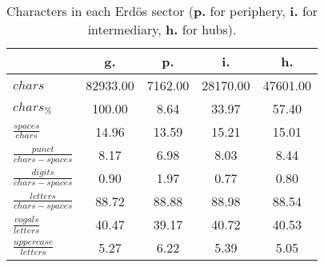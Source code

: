 \begin{table}[h!]
\begin{center}
\begin{tabular}{| l || c | c | c | c |}\hline
 & {\bf g.} & {\bf p.} & {\bf i.} & {\bf h.} \\\hline\hline
$chars$ & 82933.00  & 7162.00  & 28170.00  & 47601.00 \\
$chars_{\%}$ & 100.00  & 8.64  & 33.97  & 57.40 \\\hline
$\frac{spaces}{chars}$ & 14.96  & 13.59  & 15.21  & 15.01 \\
$\frac{punct}{chars-spaces}$ & 8.17  & 6.98  & 8.03  & 8.44 \\
$\frac{digits}{chars-spaces}$ & 0.90  & 1.97  & 0.77  & 0.80 \\\hline
$\frac{letters}{chars-spaces}$ & 88.72  & 88.88  & 88.98  & 88.54 \\
$\frac{vogals}{letters}$ & 40.47  & 39.17  & 40.72  & 40.53 \\
$\frac{uppercase}{letters}$ & 5.27  & 6.22  & 5.39  & 5.05 \\\hline
\end{tabular}
\caption{Characters in each Erd\"os sector ({{\bf p.}} for periphery, {{\bf i.}} for intermediary, 
    {{\bf h.}} for hubs).}
\end{center}
\end{table}